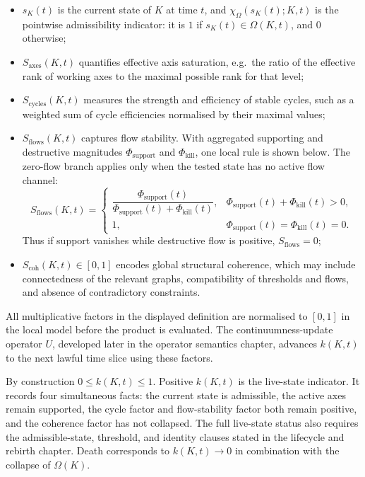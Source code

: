 \begin{itemize}
    \item \(s_K(t)\) is the current state of \(K\) at time \(t\), and
          \(\chi_{\Omega}(s_K(t);K,t)\) is the pointwise admissibility
          indicator:
          it is \(1\) if \(s_K(t)\in\Omega(K,t)\), and \(0\) otherwise;
    \item \(S_{\mathrm{axes}}(K,t)\) quantifies effective axis saturation, e.g.\ the ratio of the effective rank of working axes to the maximal possible rank for that level;
    \item \(S_{\mathrm{cycles}}(K,t)\) measures the strength and efficiency of stable cycles, such as a weighted sum of cycle efficiencies normalised by their maximal values;
    \item \(S_{\mathrm{flows}}(K,t)\) captures flow stability. With aggregated
          supporting and destructive magnitudes
          \(\Phi_{\mathrm{support}}\) and \(\Phi_{\mathrm{kill}}\), one local
          rule is shown below. The zero-flow branch applies only when the
          tested state has no active flow channel:
          \[
              S_{\mathrm{flows}}(K,t)=
              \begin{cases}
              \dfrac{\Phi_{\mathrm{support}}(t)}
                    {\Phi_{\mathrm{support}}(t)+\Phi_{\mathrm{kill}}(t)},
                    & \Phi_{\mathrm{support}}(t)+\Phi_{\mathrm{kill}}(t)>0,\\[0.7em]
              1, & \Phi_{\mathrm{support}}(t)=\Phi_{\mathrm{kill}}(t)=0.
              \end{cases}
          \]
          Thus if support vanishes while destructive flow is positive,
          \(S_{\mathrm{flows}}=0\);
    \item \(S_{\mathrm{coh}}(K,t)\in[0,1]\) encodes global structural
          coherence, which may include connectedness of the relevant graphs,
          compatibility of thresholds and flows, and absence of contradictory
          constraints.
\end{itemize}
All multiplicative factors in the displayed definition are normalised to
\([0,1]\) in the local model before the product is evaluated.
The continuumness-update operator \(U\), developed later in
the operator semantics chapter, advances \(k(K,t)\) to the next lawful time
slice using these factors.

By construction \(0 \le k(K,t) \le 1\).
Positive \(k(K,t)\) is the live-state indicator. It records four
simultaneous facts: the current state is admissible, the active axes remain
supported, the cycle factor and flow-stability factor both remain positive,
and the coherence factor has not collapsed. The full live-state status
also requires the admissible-state, threshold, and identity clauses stated in
the lifecycle and rebirth chapter.
Death corresponds to \(k(K,t)\to 0\) in combination with the collapse of \(\Omega(K)\).

